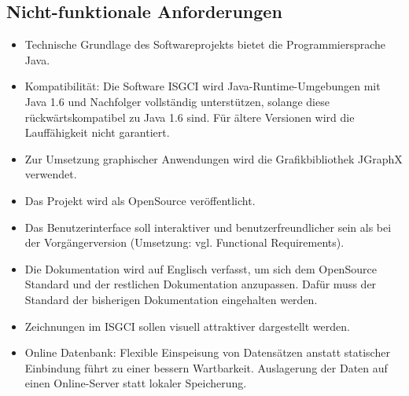 \documentclass[11pt,a4paper]{article}
\begin{document}
	\subsection{Nicht-funktionale Anforderungen} %
		\begin{itemize}
		\item Technische Grundlage des Softwareprojekts bietet die Programmiersprache Java.
		\item Kompatibilität: Die Software ISGCI wird Java-Runtime-Umgebungen mit Java 1.6 und Nachfolger vollständig unterstützen, solange diese rückwärtskompatibel zu Java 1.6 sind. Für ältere Versionen wird die Lauffähigkeit nicht garantiert.
		\item Zur Umsetzung graphischer Anwendungen wird die Grafikbibliothek JGraphX verwendet.
		\item Das Projekt wird als OpenSource veröffentlicht.
		\item Das Benutzerinterface soll interaktiver und benutzerfreundlicher sein als bei der Vorgängerversion (Umsetzung: vgl. Functional Requirements).
		\item Die Dokumentation wird auf Englisch verfasst, um sich dem OpenSource Standard und der restlichen Dokumentation anzupassen. Dafür muss der Standard der bisherigen Dokumentation eingehalten werden.
		\item Zeichnungen im ISGCI sollen visuell attraktiver dargestellt werden.
		\item Online Datenbank: Flexible Einspeisung von Datensätzen anstatt statischer Einbindung führt zu einer bessern Wartbarkeit. Auslagerung der Daten auf einen Online-Server statt lokaler Speicherung.
		\end{itemize}
		
\end{document}
